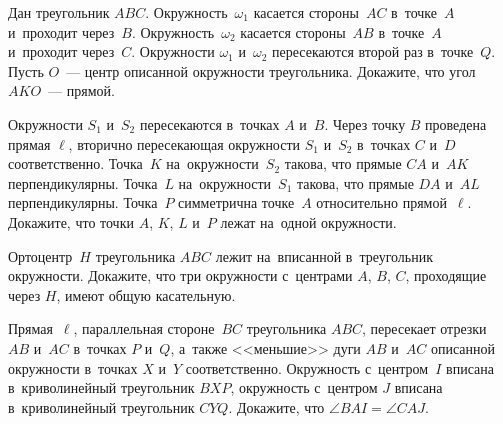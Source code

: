


\begin{problems}

\item
Дан треугольник $ABC$.
Окружность~$\omega_1$ касается стороны~$AC$ в~точке~$A$ и~проходит через~$B$.
Окружность~$\omega_2$ касается стороны~$AB$ в~точке~$A$ и~проходит через~$C$.
Окружности $\omega_1$ и~$\omega_2$ пересекаются второй раз в~точке~$Q$.
Пусть $O$~--- центр описанной окружности треугольника.
Докажите, что угол $AKO$~--- прямой.

\item
Окружности $S_{1}$ и~$S_{2}$ пересекаются в~точках $A$ и~$B$.
Через точку $B$ проведена прямая $\ell$, вторично пересекающая
окружности $S_{1}$ и~$S_{2}$ в~точках $C$ и~$D$ соответственно.
Точка~$K$ на~окружности~$S_{2}$ такова, что прямые $CA$ и~$AK$ перпендикулярны.
Точка~$L$ на~окружности~$S_{1}$ такова, что прямые $DA$ и~$AL$ перпендикулярны.
Точка~$P$ симметрична точке~$A$ относительно прямой~$\ell$.
Докажите, что точки $A$, $K$, $L$ и~$P$ лежат на~одной окружности.

\item
Ортоцентр~$H$ треугольника $ABC$ лежит на~вписанной в~треугольник окружности.
Докажите, что три окружности с~центрами $A$, $B$, $C$, проходящие через $H$,
имеют общую касательную.

\item
Прямая~$\ell$, параллельная стороне~$BC$ треугольника $ABC$, пересекает отрезки
$AB$ и~$AC$ в~точках $P$ и~$Q$, а~также <<меньшие>> дуги $AB$ и~$AC$ описанной
окружности в~точках $X$ и~$Y$ соответственно.
Окружность с~центром~$I$ вписана в~криволинейный треугольник $BXP$, окружность
с~центром $J$ вписана в~криволинейный треугольник $CYQ$.
Докажите, что $\angle BAI = \angle CAJ$.

\end{problems}


